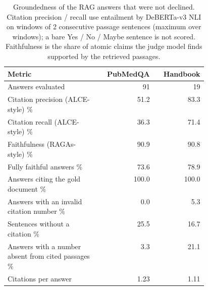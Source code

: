 \begin{table}[t]
\centering\small
\begin{tabular}{p{0.46\linewidth}rr}
\toprule
Metric & PubMedQA & Handbook \\
\midrule
Answers evaluated & 91 & 19 \\
Citation precision (ALCE-style) \% & 51.2 & 83.3 \\
Citation recall (ALCE-style) \% & 36.3 & 71.4 \\
Faithfulness (RAGAs-style) \% & 90.9 & 90.8 \\
Fully faithful answers \% & 73.6 & 78.9 \\
Answers citing the gold document \% & 100.0 & 100.0 \\
Answers with an invalid citation number \% & 0.0 & 5.3 \\
Sentences without a citation \% & 25.5 & 16.7 \\
Answers with a number absent from cited passages \% & 3.3 & 21.1 \\
Citations per answer & 1.23 & 1.11 \\
\bottomrule
\end{tabular}
\caption{Groundedness of the RAG answers that were not declined. Citation precision / recall use entailment by DeBERTa-v3 NLI on windows of 2 consecutive passage sentences (maximum over windows); a bare Yes / No / Maybe sentence is not scored. Faithfulness is the share of atomic claims the judge model finds supported by the retrieved passages.}
\label{tab:grounding}
\end{table}
